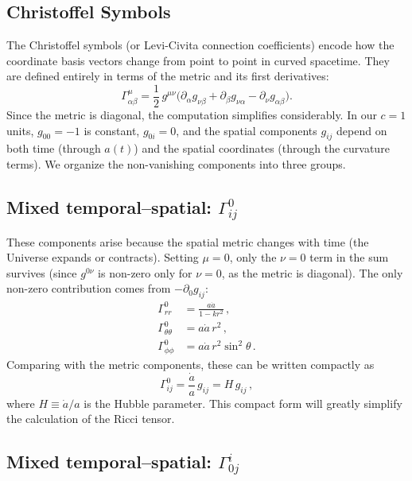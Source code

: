 \subsection{Christoffel Symbols}

The Christoffel symbols (or Levi-Civita connection coefficients) encode how the coordinate basis vectors change from point to point in curved spacetime. They are defined entirely in terms of the metric and its first derivatives:
\begin{equation}
    \Gamma^\mu_{\alpha\beta} = \frac{1}{2}\,g^{\mu\nu}\bigl(\partial_\alpha g_{\nu\beta} + \partial_\beta g_{\nu\alpha} - \partial_\nu g_{\alpha\beta}\bigr).
\end{equation}
Since the metric is diagonal, the computation simplifies considerably. In our $c=1$ units, $g_{00}=-1$ is constant, $g_{0i}=0$, and the spatial components $g_{ij}$ depend on both time (through $a(t)$) and the spatial coordinates (through the curvature terms). We organize the non-vanishing components into three groups.

\subsection*{Mixed temporal--spatial: $\Gamma^0_{ij}$}

These components arise because the spatial metric changes with time (the Universe expands or contracts). Setting $\mu=0$, only the $\nu=0$ term in the sum survives (since $g^{0\nu}$ is non-zero only for $\nu=0$, as the metric is diagonal). The only non-zero contribution comes from $-\partial_0 g_{ij}$:
\begin{align}
    \Gamma^0_{rr} &= \frac{a\dot{a}}{1-kr^2}\,,\\[4pt]
    \Gamma^0_{\theta\theta} &= a\dot{a}\,r^2\,,\\[4pt]
    \Gamma^0_{\phi\phi} &= a\dot{a}\,r^2\sin^2\!\theta\,.
\end{align}
Comparing with the metric components, these can be written compactly as
\begin{equation}\label{eq:gamma0ij}
    \Gamma^0_{ij} = \frac{\dot{a}}{a}\,g_{ij} = H\,g_{ij}\,,
\end{equation}
where $H\equiv\dot{a}/a$ is the Hubble parameter. This compact form will greatly simplify the calculation of the Ricci tensor.

\subsection*{Mixed temporal--spatial: $\Gamma^i_{0j}$}

